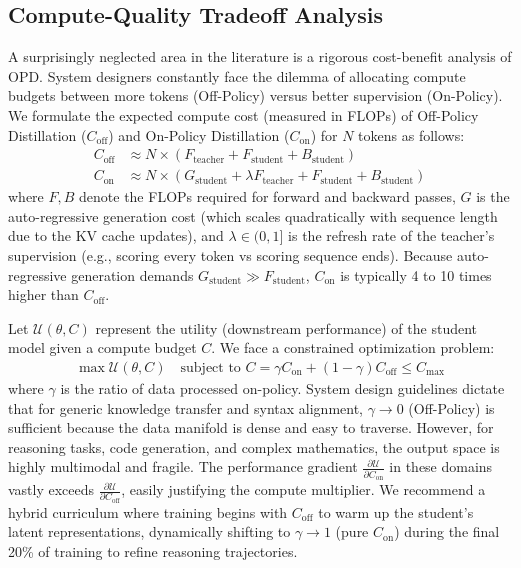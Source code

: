 \documentclass{article} %
\begin{document}
\subsection{Compute-Quality Tradeoff Analysis}
A surprisingly neglected area in the literature is a rigorous cost-benefit analysis of OPD. System designers constantly face the dilemma of allocating compute budgets between more tokens (Off-Policy) versus better supervision (On-Policy). We formulate the expected compute cost (measured in FLOPs) of Off-Policy Distillation ($C_{\text{off}}$) and On-Policy Distillation ($C_{\text{on}}$) for $N$ tokens as follows:
\begin{align}
C_{\text{off}} &\approx N \times (F_{\text{teacher}} + F_{\text{student}} + B_{\text{student}}) \\
C_{\text{on}} &\approx N \times \left( G_{\text{student}} + \lambda F_{\text{teacher}} + F_{\text{student}} + B_{\text{student}} \right)
\end{align}
where $F, B$ denote the FLOPs required for forward and backward passes, $G$ is the auto-regressive generation cost (which scales quadratically with sequence length due to the KV cache updates), and $\lambda \in (0, 1]$ is the refresh rate of the teacher's supervision (e.g., scoring every token vs scoring sequence ends). Because auto-regressive generation demands $G_{\text{student}} \gg F_{\text{student}}$, $C_{\text{on}}$ is typically 4 to 10 times higher than $C_{\text{off}}$.

Let $\mathcal{U}(\theta, C)$ represent the utility (downstream performance) of the student model given a compute budget $C$. We face a constrained optimization problem:
\begin{align}
\max \mathcal{U}(\theta, C) \quad \text{subject to } C = \gamma C_{\text{on}} + (1 - \gamma) C_{\text{off}} \le C_{\text{max}}
\end{align}
where $\gamma$ is the ratio of data processed on-policy. System design guidelines dictate that for generic knowledge transfer and syntax alignment, $\gamma \to 0$ (Off-Policy) is sufficient because the data manifold is dense and easy to traverse. However, for reasoning tasks, code generation, and complex mathematics, the output space is highly multimodal and fragile. The performance gradient $\frac{\partial \mathcal{U}}{\partial C_{\text{on}}}$ in these domains vastly exceeds $\frac{\partial \mathcal{U}}{\partial C_{\text{off}}}$, easily justifying the compute multiplier. We recommend a hybrid curriculum where training begins with $C_{\text{off}}$ to warm up the student's latent representations, dynamically shifting to $\gamma \to 1$ (pure $C_{\text{on}}$) during the final 20\% of training to refine reasoning trajectories.
\end{document}
